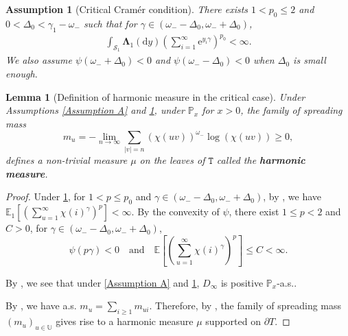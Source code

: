 \documentclass[12pt]{article}
\numberwithin{equation}{section}
\theoremstyle{plain}
\newtheorem{lem}[thm]{Lemma}
\newtheorem{Assump}[thm]{Assumption}
\theoremstyle{definition}
\newcommand{\D}{\mathrm{d}}
\begin{document}
\begin{Assump}[Critical Cram\'er condition]\label{Assumption B}
There exists $1<p_0\le 2$ and $0<\Delta_0<\gamma_1-\omega_-$ such that for $\gamma\in (\omega_--\Delta_0, \omega_- + \Delta_0)$,
\begin{align}\label{eq: assumption p moment}
\int_{\mathcal{S}_1} \mathbf{\Lambda}_1(\D y )\left(\sum_{i=1}^{\infty}\mathrm{e}^{y_i\gamma}\right)^{p_0}<\infty.
\end{align}
We also assume $\psi(\omega_-+\Delta_0)<0$ and $\psi(\omega_--\Delta_0)<0$ when $\Delta_0$ is small enough.
\end{Assump}



\begin{lem}[Definition of harmonic measure in the critical case] Under Assumptions \ref{Assumption A} and \ref{Assumption B}, under $\mathbb{P}_x$ for $x>0$, the family of spreading mass
\begin{equation}\label{eq: spread mass critical}
m_u = -\lim_{n\to\infty} \sum_{|v|=n}(\chi(uv))^{\omega_-}\log(\chi(uv))\ge 0,
\end{equation}
defines a non-trivial measure $\mu$ on the leaves of $\mathtt{T}$ called the \textbf{harmonic measure}.
\end{lem}
\begin{proof}
\noindent Under \cref{Assumption B}, for $1<p\leq p_0$ and $\gamma\in (\omega_--\Delta_0, \omega_- + \Delta_0)$, by \cite{IksanovAlexander2019Arop}, we have $\mathbb{E}_1[(\sum^{\infty}_{u=1}\chi(i)^{\gamma})^p]< \infty.$
\noindent By the convexity of $\psi$, there exist $1\le p<2$ and $C > 0$, for $\gamma\in  (\omega_--\Delta_0, \omega_- + \Delta_0)$,
\begin{equation}\label{eq: uniform p moment}
\psi(p\gamma)<0\quad \mbox{and}\quad \mathbb{E}\left[\left(\sum^{\infty}_{u=1}\chi(i)^{\gamma}\right)^{p}\right] \leq C<\infty.
\end{equation}

By \cite{ChenXinxin2015Anas}, we see that under \cref{Assumption A} and \cref{Assumption B}, $D_{\infty}$ is positive $\mathbb{P}_x$-a.s..

\noindent By \cite[Lemma 6.1]{buraczewski2021derivative}, we have a.s. $m_u=\sum_{i\geq 1} m_{ui}$. Therefore, by \cite[Section 1.3]{BertoinJean2024SMta}, the family of spreading mass $(m_u)_{u\in\mathbb{U}}$ gives rise to a harmonic measure $\mu$ supported on $\partial T$.

\end{proof}
\end{document}
